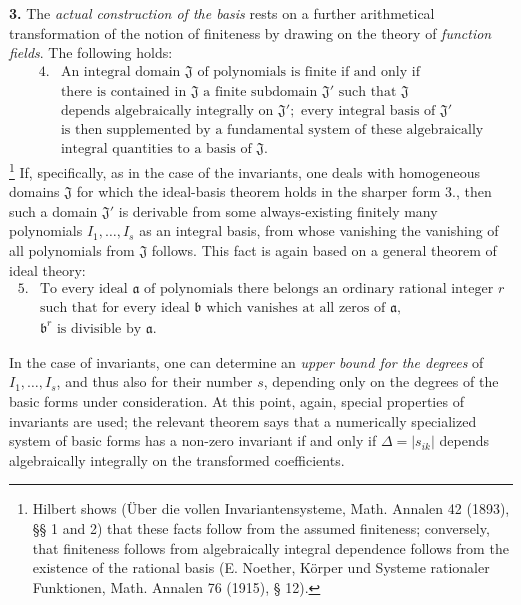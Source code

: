 \documentclass[11pt]{article}
\providecommand{\mJ}{\mathfrak J}
\providecommand{\ma}{\mathfrak a}
\providecommand{\mb}{\mathfrak b}
\providecommand{\D}{\Delta}
\begin{document}
\textbf{3.} The \emph{actual construction of the basis} rests on a further arithmetical transformation of the notion of finiteness by drawing on the theory of \emph{function fields}. The following holds:
\[
\begin{array}{ll}
4.& \text{An integral domain }\mJ\text{ of polynomials is finite if and only if}\\
& \text{there is contained in }\mJ\text{ a finite subdomain }\mJ'\text{ such that }\mJ\\
& \text{depends algebraically integrally on }\mJ';\text{ every integral basis of }\mJ'\\
& \text{is then supplemented by a fundamental system of these algebraically}\\
& \text{integral quantities to a basis of }\mJ.
\end{array}
\]
\footnote{Hilbert shows (Über die vollen Invariantensysteme, Math. Annalen 42 (1893), §§ 1 and 2) that these facts follow from the assumed finiteness; conversely, that finiteness follows from algebraically integral dependence follows from the existence of the rational basis (E. Noether, Körper und Systeme rationaler Funktionen, Math. Annalen 76 (1915), § 12).}
If, specifically, as in the case of the invariants, one deals with homogeneous domains $\mJ$ for which the ideal-basis theorem holds in the sharper form 3., then such a domain $\mJ'$ is derivable from some always-existing finitely many polynomials $I_1,\ldots,I_s$ as an integral basis, from whose vanishing the vanishing of all polynomials from $\mJ$ follows. This fact is again based on a general theorem of ideal theory:
\[
\begin{array}{ll}
5.& \text{To every ideal }\ma\text{ of polynomials there belongs an ordinary rational integer }r\\
& \text{such that for every ideal }\mb\text{ which vanishes at all zeros of }\ma,\\
& \mb^r\text{ is divisible by }\ma.
\end{array}
\]

In the case of invariants, one can determine an \emph{upper bound for the degrees} of $I_1,\ldots,I_s$, and thus also for their number $s$, depending only on the degrees of the basic forms under consideration. At this point, again, special properties of invariants are used; the relevant theorem says that a numerically specialized system of basic forms has a non-zero invariant if and only if $\D=|s_{ik}|$ depends algebraically integrally on the transformed coefficients.
\end{document}
